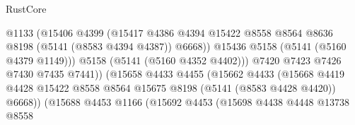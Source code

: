 \begin{lexlean}{RustCore}
\begin{coremodule}
                                              @1133
                                              (@15406
                                                @4399
                                                (@15417
                                                  @4386
                                                  @4394
                                                  @15422
                                                  @8558
                                                  @8564
                                                  @8636
                                                  @8198
                                                  (@5141 (@8583 @4394 @4387))
                                                  @6668))
                                              @15436
                                              @5158
                                              (@5141 (@5160 @4379 @1149)))
                                            @5158
                                            (@5141 (@5160 @4352 @4402)))
                                          @7420
                                          @7423
                                          @7426
                                          @7430
                                          @7435
                                          @7441))
                                      (@15658
                                        @4433
                                        @4455
                                        (@15662
                                          @4433
                                          (@15668
                                            @4419
                                            @4428
                                            @15422
                                            @8558
                                            @8564
                                            @15675
                                            @8198
                                            (@5141 (@8583 @4428 @4420))
                                            @6668))
                                        (@15688
                                          @4453
                                          @1166
                                          (@15692
                                            @4453
                                            (@15698
                                              @4438
                                              @4448
                                              @13738
                                              @8558

\end{coremodule}
\end{lexlean}
